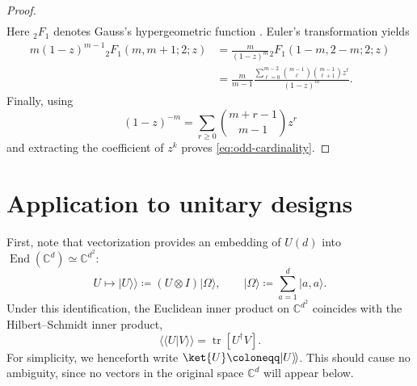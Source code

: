 \documentclass[aps,twocolumn,pra,superscriptaddress,nofootinbib]{revtex4-2}
\begin{document}
\begin{proof}
\begin{align}
        \label{eq:odd-hypergeometric-short}
    \end{align}
    {Here} ${}_2F_1$ denotes Gauss's hypergeometric function
    \cite[\href{https://dlmf.nist.gov/15.2}{Section~15.2}]{NIST:DLMF}.
    Euler's transformation
    \cite[\href{https://dlmf.nist.gov/15.8.E1}{Eq.~(15.8.1)}]{NIST:DLMF} yields
    \begin{align}
        m(1-z)^{m-1}{}_2F_1(m,m+1;2;z)
        &=
        \frac{m}{(1-z)^m}
        {}_2F_1(1-m,2-m;2;z)
        \nonumber\\
        &=
        \frac{m}{m-1}
        \frac{
            \displaystyle
            \sum_{\ell=0}^{m-2}
            \binom{m-1}{\ell}
            \binom{m-1}{\ell+1}z^\ell
        }{(1-z)^m}.
    \end{align}
    Finally, using
    \begin{equation}
        (1-z)^{-m}
        =
        \sum_{r\geq0}
        \binom{m+r-1}{m-1}z^r
    \end{equation}
    and extracting the coefficient of $z^k$ proves
    \eqref{eq:odd-cardinality}.
\end{proof}




\section{Application to \texorpdfstring{{unitary designs}}{unitary designs}}\label{app:unitary-designs}

First, note that vectorization provides an embedding of $U(d)$ into
$\operatorname{End}(\mathbb{C}^{d})\simeq\mathbb{C}^{d^{2}}$:
\begin{equation}
    U\longmapsto
    \lvert U\rangle\!\rangle
    \coloneqq
    (U\otimes I)\lvert\Omega\rangle,
    \qquad
    \lvert\Omega\rangle
    \coloneqq
    \sum_{a=1}^{d}\lvert a,a\rangle .
\end{equation}
Under this identification, the Euclidean inner product on
$\mathbb{C}^{d^{2}}$ coincides with the Hilbert--Schmidt inner product,
\begin{equation}
    \langle\!\langle U\vert V\rangle\!\rangle
    =
    \operatorname{tr}\!\left[U^{\dagger}V\right].
\end{equation}
For simplicity, we henceforth write $\ket{U}\coloneqq\lvert
U\rangle\!\rangle$. This should cause no ambiguity, since no vectors in
the original space $\mathbb{C}^{d}$ will appear below.
\end{document}
